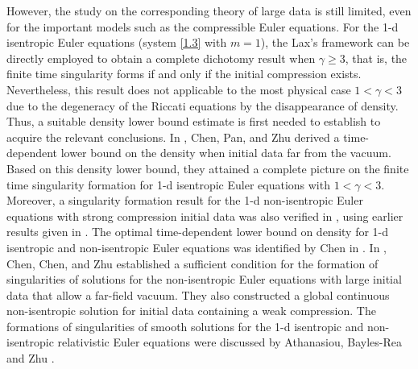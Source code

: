 \documentclass[11pt,reqno]{article}
\numberwithin{equation}{section}
\begin{document}
However, the study on the corresponding theory of large data is still limited, even for the important models such as the compressible Euler equations. For the 1-d isentropic Euler equations (system \eqref{1.3} with $m=1$), the Lax's framework can be directly employed to obtain a complete dichotomy result when $\gamma\geq3$, that is, the finite time singularity forms if and only if the initial compression exists. Nevertheless, this result does not applicable to the most physical case $1<\gamma<3$ due to the degeneracy of the Riccati equations by the disappearance of density.
Thus, a suitable density lower bound estimate is first needed to establish to acquire the relevant conclusions. In \cite{CPZ}, Chen, Pan, and Zhu derived a time-dependent lower
bound on the density when initial data far from the vacuum. Based on this density lower bound, they attained a complete picture on the finite time singularity formation for 1-d isentropic Euler equations with $1<\gamma<3$. Moreover, a singularity formation result for the 1-d non-isentropic Euler equations with strong compression initial data was also verified in \cite{CPZ}, using earlier results given in \cite{G3,CYZ}.
The optimal time-dependent lower bound on density for 1-d isentropic and non-isentropic Euler equations was identified by Chen in \cite{G9, G10}. In \cite{CCZ}, Chen, Chen, and Zhu established a sufficient condition for the formation of singularities of solutions for the non-isentropic Euler equations with large initial data that allow a far-field vacuum. They also constructed a global continuous non-isentropic solution for initial data containing a weak compression. The formations of singularities of smooth solutions for the 1-d isentropic and non-isentropic relativistic Euler equations were discussed by Athanasiou, Bayles-Rea and Zhu \cite{A-Zhu1, A-Zhu2}.
\end{document}
